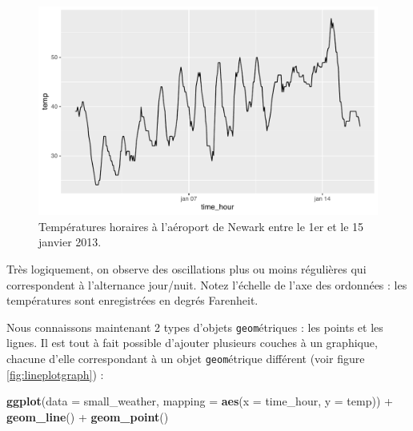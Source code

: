\documentclass[
  a4paper,
]{article}
\newenvironment{Shaded}{\begin{snugshade}}{\end{snugshade}}
\newcommand{\DataTypeTok}[1]{\textcolor[rgb]{0.00,0.34,0.68}{#1}}
\newcommand{\KeywordTok}[1]{\textcolor[rgb]{0.12,0.11,0.11}{\textbf{#1}}}
\newcommand{\NormalTok}[1]{\textcolor[rgb]{0.12,0.11,0.11}{#1}}
\newcommand{\OperatorTok}[1]{\textcolor[rgb]{0.12,0.11,0.11}{#1}}
\newcommand{\StringTok}[1]{\textcolor[rgb]{0.75,0.01,0.01}{#1}}
\begin{document}
\begin{figure}[htpb]

{\centering \includegraphics[width=0.9\linewidth]{figure/linegraph-1} 

}

\caption{Températures horaires à l'aéroport de Newark entre le 1er et le 15 janvier 2013.}\label{fig:linegraph}
\end{figure}

Très logiquement, on observe des oscillations plus ou moins régulières qui correspondent à l'alternance jour/nuit. Notez l'échelle de l'axe des ordonnées : les températures sont enregistrées en degrés Farenheit.

Nous connaissons maintenant 2 types d'objets \texttt{geom}étriques : les points et les lignes. Il est tout à fait possible d'ajouter plusieurs couches à un graphique, chacune d'elle correspondant à un objet \texttt{geom}étrique différent (voir figure \ref{fig:lineplotgraph}) :

\begin{Shaded}
\begin{Highlighting}[]
\KeywordTok{ggplot}\NormalTok{(}\DataTypeTok{data =}\NormalTok{ small_weather, }\DataTypeTok{mapping =} \KeywordTok{aes}\NormalTok{(}\DataTypeTok{x =}\NormalTok{ time_hour, }\DataTypeTok{y =}\NormalTok{ temp)) }\OperatorTok{+}
\StringTok{  }\KeywordTok{geom_line}\NormalTok{() }\OperatorTok{+}
\StringTok{  }\KeywordTok{geom_point}\NormalTok{()}
\end{Highlighting}
\end{Shaded}
\end{document}
